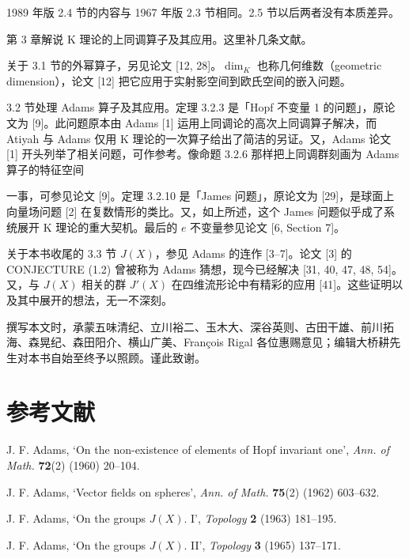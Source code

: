 1989 年版 2.4 节的内容与 1967 年版 2.3 节相同。2.5 节以后两者没有本质差异。


第 3 章解说 K 理论的上同调算子及其应用。这里补几条文献。

关于 3.1 节的外幂算子，另见论文 [12, 28]。$\dim_{K}$ 也称几何维数（geometric dimension），论文 [12] 把它应用于实射影空间到欧氏空间的嵌入问题。

3.2 节处理 Adams 算子及其应用。定理 3.2.3 是「Hopf 不变量 1 的问题」，原论文为 [9]。此问题原本由 Adams [1] 运用上同调论的高次上同调算子解决，而 Atiyah 与 Adams 仅用 K 理论的一次算子给出了简洁的另证。又，Adams 论文 [1] 开头列举了相关问题，可作参考。像命题 3.2.6 那样把上同调群刻画为 Adams 算子的特征空间

一事，可参见论文 [9]。定理 3.2.10 是「James 问题」，原论文为 [29]，是球面上向量场问题 [2] 在复数情形的类比。又，如上所述，这个 James 问题似乎成了系统展开 K 理论的重大契机。最后的 $e$ 不变量参见论文 [6, Section 7]。

关于本书收尾的 3.3 节 $J(X)$，参见 Adams 的连作 [3--7]。论文 [3] 的 CONJECTURE (1.2) 曾被称为 Adams 猜想，现今已经解决 [31, 40, 47, 48, 54]。又，与 $J(X)$ 相关的群 $J'(X)$ 在四维流形论中有精彩的应用 [41]。这些证明以及其中展开的想法，无一不深刻。

撰写本文时，承蒙五味清纪、立川裕二、玉木大、深谷英则、古田干雄、前川拓海、森晃纪、森田阳介、横山广美、François Rigal 各位惠赐意见；编辑大桥耕先生对本书自始至终予以照顾。谨此致谢。


\section*{参考文献}
\begingroup
\small
\noindent [1] J. F. Adams, `On the non-existence of elements of Hopf invariant one', \textit{Ann. of Math.} \textbf{72}(2) (1960) 20--104.

\noindent [2] J. F. Adams, `Vector fields on spheres', \textit{Ann. of Math.} \textbf{75}(2) (1962) 603--632.

\noindent [3] J. F. Adams, `On the groups $J(X)$. I', \textit{Topology} \textbf{2} (1963) 181--195.

\noindent [4] J. F. Adams, `On the groups $J(X)$. II', \textit{Topology} \textbf{3} (1965) 137--171.

